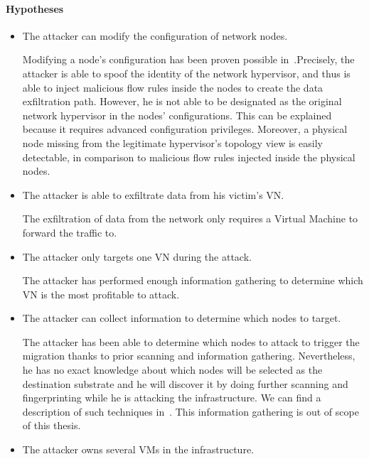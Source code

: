 \paragraph{Hypotheses}
\begin{itemize}
    \item The attacker can modify the configuration of network nodes.
    
    Modifying a node's configuration has been proven  possible in~\cite{Taxonomy_Hizver2015, Bokani2015, attain-Ujcich2017}.Precisely, the attacker is able to spoof the identity of the network hypervisor, and thus is able to inject malicious flow rules inside the nodes to create the data exfiltration path. 
    However, he is not able to be designated as the original network hypervisor in the nodes' configurations. 
    This can be explained because it requires advanced configuration privileges. Moreover, a physical node missing from the legitimate hypervisor's topology view is easily detectable, in comparison to malicious flow rules injected inside the physical nodes.
    
    \item The attacker is able to exfiltrate data from his victim's VN.
    
    The exfiltration of data from the network only requires a Virtual Machine to forward the traffic to.
    
    \item The attacker only targets one VN during the attack.
    
     The attacker has performed enough information gathering to determine which VN is the most profitable to attack.
     
    
    \item The attacker can collect information to determine which nodes to target.
    
    The attacker has been able to determine which nodes to attack to trigger the migration thanks to prior scanning and information gathering. 
    Nevertheless, he has no exact knowledge about which nodes will be selected as the destination substrate and he will discover it by doing further scanning and fingerprinting  while he is attacking the infrastructure.  
    We can find a description of such techniques in~\cite{Hong2015,Sphinx-Dhawan2015}.
    This information gathering is out of scope of this thesis.
    
    \item The attacker owns several VMs in the infrastructure.
    

\end{itemize}

